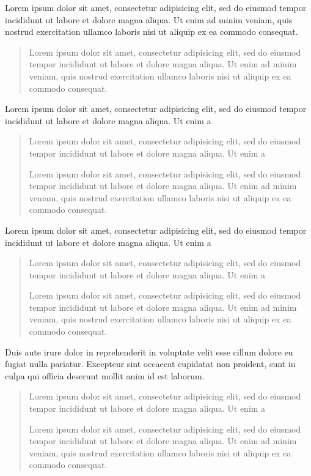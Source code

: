 \documentclass{article}
\begin{document}
    Lorem ipsum dolor sit amet, consectetur adipisicing elit, sed do eiusmod tempor incididunt ut labore et dolore magna aliqua. Ut enim ad minim veniam, quis nostrud exercitation ullamco laboris nisi ut aliquip ex ea commodo consequat.  
    \begin{quotation}
        Lorem ipsum dolor sit amet, consectetur adipisicing elit, sed do eiusmod tempor incididunt ut labore et dolore magna aliqua. Ut enim ad minim veniam, quis nostrud exercitation ullamco laboris nisi ut aliquip ex ea commodo consequat. 
    \end{quotation}
      Lorem ipsum dolor sit amet, consectetur adipisicing elit, sed do eiusmod tempor incididunt ut labore et dolore magna aliqua. Ut enim a
    
    \begin{quote}
    
    Lorem ipsum dolor sit amet, consectetur adipisicing elit, sed do eiusmod tempor incididunt ut labore et dolore magna aliqua. Ut enim a
    
  Lorem ipsum dolor sit amet, consectetur adipisicing elit, sed do eiusmod tempor incididunt ut labore et dolore magna aliqua. Ut enim ad minim veniam, quis nostrud exercitation ullamco laboris nisi ut aliquip ex ea commodo consequat. 
    \end{quote}
\begingroup
  \beginnumbering
	
    \pstart
    \lipsum[1]
    \pend
	

    \pstart
    Lorem ipsum dolor sit amet, consectetur adipisicing elit, sed do eiusmod tempor incididunt ut labore et dolore magna aliqua. Ut enim a
    \begin{quotation}
    Lorem ipsum dolor sit amet, consectetur adipisicing elit, sed do eiusmod tempor incididunt ut labore et dolore magna aliqua. Ut enim a
    
  Lorem ipsum dolor sit amet, consectetur adipisicing elit, sed do eiusmod tempor incididunt ut labore et dolore magna aliqua. Ut enim ad minim veniam, quis nostrud exercitation ullamco laboris nisi ut aliquip ex ea commodo consequat. 
    \end{quotation}
  
  
   Duis aute irure dolor in reprehenderit in voluptate velit esse cillum dolore eu fugiat nulla pariatur. Excepteur sint occaecat cupidatat non proident, sunt in culpa qui officia deserunt mollit anim id est laborum.
    
     \begin{quote} 
    Lorem ipsum dolor sit amet, consectetur adipisicing elit, sed do eiusmod tempor incididunt ut labore et dolore magna aliqua. Ut enim a
    
  Lorem ipsum dolor sit amet, consectetur adipisicing elit, sed do eiusmod tempor incididunt ut labore et dolore magna aliqua. Ut enim ad minim veniam, quis nostrud exercitation ullamco laboris nisi ut aliquip ex ea commodo consequat. 
    \end{quote}
    
    \pend
    \pstart
    \lipsum[3]
    \pend

  \endnumbering
\endgroup
\end{document}
